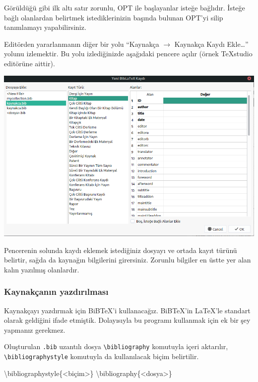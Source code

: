 \documentclass[
  10pt,
]{scrbook}
\newenvironment{Shaded}{\begin{snugshade}}{\end{snugshade}}
\newcommand{\BuiltInTok}[1]{#1}
\newcommand{\ExtensionTok}[1]{#1}
\newcommand{\NormalTok}[1]{#1}
\theoremstyle{definition}
\theoremstyle{definition}
\theoremstyle{definition}
\theoremstyle{definition}
\theoremstyle{remark}
\begin{document}
Görüldüğü gibi ilk altı satır zorunlu, OPT ile başlayanlar isteğe bağlıdır. İsteğe bağlı olanlardan belirtmek istediklerinizin başında bulunan OPT'yi silip tanımlamayı yapabilirsiniz.

Editörden yararlanmanın diğer bir yolu ``Kaynakça \(\rightarrow\) Kaynakça Kaydı Ekle\ldots{}'' yolunu izlemektir. Bu yolu izlediğinizde aşağıdaki pencere açılır (örnek TeXstudio editörüne aittir).

\includegraphics{images/tex-studio.png}

Pencerenin solunda kaydı eklemek istediğiniz dosyayı ve ortada kayıt türünü belirtir, sağda da kaynağın bilgilerini girersiniz. Zorunlu bilgiler en üstte yer alan kalın yazılmış olanlardır.

\hypertarget{kaynakuxe7anux131n-yazdux131rux131lmasux131}{%
\subsubsection{Kaynakçanın yazdırılması}\label{kaynakuxe7anux131n-yazdux131rux131lmasux131}}

Kaynakçayı yazdırmak için BiBTeX'i kullanacağız. BiBTeX'in LaTeX'le standart olarak geldiğini ifade etmiştik. Dolayısıyla bu programı kullanmak için ek bir şey yapmanız gerekmez.

Oluşturulan \texttt{.bib} uzantılı dosya \texttt{\textbackslash{}bibliography} komutuyla içeri aktarılır, \texttt{\textbackslash{}bibliographystyle} komutuyla da kullanılacak biçim belirtilir.

\begin{Shaded}
\begin{Highlighting}[]
\BuiltInTok{\textbackslash{}bibliographystyle}\NormalTok{\{}\ExtensionTok{\textless{}biçim\textgreater{}}\NormalTok{\}}
\BuiltInTok{\textbackslash{}bibliography}\NormalTok{\{}\ExtensionTok{\textless{}dosya\textgreater{}}\NormalTok{\}}
\end{Highlighting}
\end{Shaded}
\end{document}
